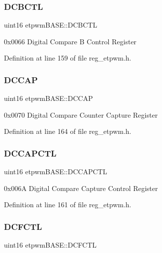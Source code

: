 \subsubsection{\texorpdfstring{D\+C\+B\+C\+TL}{DCBCTL}}
{\footnotesize\ttfamily uint16 etpwm\+B\+A\+S\+E\+::\+D\+C\+B\+C\+TL}

0x0066 Digital Compare B Control Register 

Definition at line 159 of file reg\+\_\+etpwm.\+h.

\mbox{\label{structetpwmBASE_a67c1232483347bde0639a3595bcbbb18}} 
\subsubsection{\texorpdfstring{D\+C\+C\+AP}{DCCAP}}
{\footnotesize\ttfamily uint16 etpwm\+B\+A\+S\+E\+::\+D\+C\+C\+AP}

0x0070 Digital Compare Counter Capture Register 

Definition at line 164 of file reg\+\_\+etpwm.\+h.

\mbox{\label{structetpwmBASE_a971e8e616f876606dc0c02ca7d0d20b4}} 
\subsubsection{\texorpdfstring{D\+C\+C\+A\+P\+C\+TL}{DCCAPCTL}}
{\footnotesize\ttfamily uint16 etpwm\+B\+A\+S\+E\+::\+D\+C\+C\+A\+P\+C\+TL}

0x006A Digital Compare Capture Control Register 

Definition at line 161 of file reg\+\_\+etpwm.\+h.

\mbox{\label{structetpwmBASE_a48daa3c3dd45dde65f8a9cdc0409ce26}} 
\subsubsection{\texorpdfstring{D\+C\+F\+C\+TL}{DCFCTL}}
{\footnotesize\ttfamily uint16 etpwm\+B\+A\+S\+E\+::\+D\+C\+F\+C\+TL}

